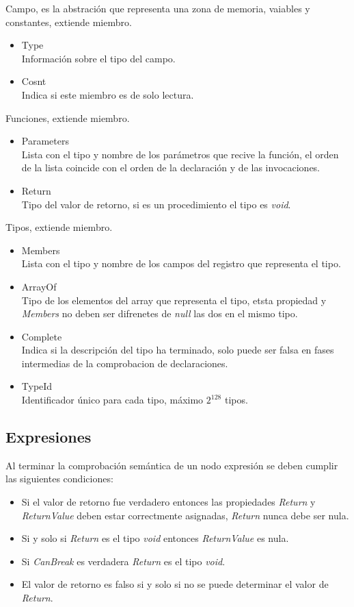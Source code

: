 \documentclass[a4paper,10pt]{article}
\begin{document}
		Campo, es la abstración que representa una zona de memoria, vaiables y constantes, extiende miembro.
		\begin{itemize}
			\item Type\\
				Información sobre el tipo del campo.
			\item Cosnt\\			
				Indica si este miembro es de solo lectura.
		\end{itemize}
		
		Funciones, extiende miembro.
		\begin{itemize}
			\item Parameters\\
				Lista con el tipo y nombre de los parámetros que recive la función, el orden de la lista coincide con el orden de la declaración y de las invocaciones.
			\item Return\\			
				Tipo del valor de retorno, si es un procedimiento el tipo es \textit{void}.
		\end{itemize}
	
		Tipos, extiende miembro.
		\begin{itemize}
			\item Members\\
				Lista con el tipo y nombre de los campos del registro que representa el tipo.
			\item ArrayOf\\
				Tipo de los elementos del array que representa el tipo, etsta propiedad y \textit{Members} no deben ser difrenetes de \textit{null} las dos en el mismo tipo.
			\item Complete\\
				Indica si la descripción del tipo ha terminado, solo puede ser falsa en fases intermedias de la comprobacion de declaraciones.
			\item TypeId\\			
			Identificador único para cada tipo, máximo $2^{128}$ tipos.
		\end{itemize}
				
		\subsection{Expresiones}
		Al terminar la comprobación semántica de un nodo expresión se deben cumplir las siguientes condiciones:
		\begin{itemize}
			\item Si el valor de retorno fue verdadero entonces las propiedades \textit{Return} y \textit{ReturnValue} deben estar correctmente asignadas, \textit{Return} nunca debe ser nula.
			\item Si y solo si \textit{Return} es el tipo \textit{void} entonces \textit{ReturnValue} es nula.
			\item Si \textit{CanBreak} es verdadera \textit{Return} es el tipo \textit{void}.
			\item El valor de retorno es falso si y solo si no se puede determinar el valor de \textit{Return}.
		\end{itemize}
		
\end{document}
